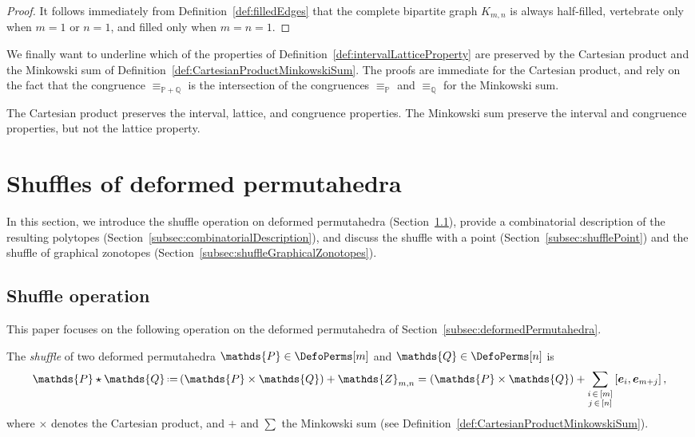 \documentclass[AHL,Unicode,longabstracts,published]{cedram}
\renewcommand{\b}[1]{\boldsymbol{#1}}
\newcommand{\eqdef}{\mbox{\,\raisebox{0.2ex}{\scriptsize\ensuremath{\mathrm:}}\ensuremath{=}\,}}
\newcommand{\shuffleDP}{\star} %
\newcommand{\polytope}[1]{\mathds{#1}}
\begin{document}
\begin{proof}
It follows immediately from Definition~\ref{def:filledEdges} that the complete bipartite graph $K_{m,n}$ is always half-filled, vertebrate only when $m = 1$ or $n = 1$, and filled only when $m = n = 1$.
\end{proof}

We finally want to underline which of the properties of Definition~\ref{def:intervalLatticeProperty} are preserved by the Cartesian product and the Minkowski sum of Definition~\ref{def:CartesianProductMinkowskiSum}. The proofs are immediate for the Cartesian product, and rely on the fact that the congruence $\equiv_{\polytope{P} + \polytope{Q}}$ is the intersection of the congruences $\equiv_\polytope{P}$ and $\equiv_\polytope{Q}$ for the Minkowski sum.

\begin{prop}\label{prop:CartesianProductMinkowskiSumLatticeProperties}
The Cartesian product preserves the interval, lattice, and congruence properties. The Minkowski sum preserve the interval and congruence properties, but not the lattice property.
\end{prop}



\section{Shuffles of deformed permutahedra}\label{sec:shuffles}

In this section, we introduce the shuffle operation on deformed permutahedra (Section~\ref{subsec:shuffle}), provide a combinatorial description of the resulting polytopes (Section~\ref{subsec:combinatorialDescription}), and discuss the shuffle with a point (Section~\ref{subsec:shufflePoint}) and the shuffle of graphical zonotopes (Section~\ref{subsec:shuffleGraphicalZonotopes}).



\subsection{Shuffle operation}\label{subsec:shuffle}

This paper focuses on the following operation on the deformed permutahedra of Section~\ref{subsec:deformedPermutahedra}.

\begin{defi}\label{def:shuffleDeformedPermutahedra}
The
\emph{shuffle} of two deformed permutahedra $\polytope{P} \in \DefoPerms[m]$ and $\polytope{Q} \in \DefoPerms[n]$ is
\[
\polytope{P} \shuffleDP \polytope{Q} \eqdef (\polytope{P} \times \polytope{Q}) + \polytope{Z}_{m,n} = (\polytope{P} \times \polytope{Q}) + \sum_{\substack{i\,\in\,[m] \\
j\,\in\,[n]}} \left[\b{e}_i, \b{e}_{m+j}\right],
\]
where $\times$ denotes the Cartesian product, and $+$ and $\sum$ the Minkowski sum (see Definition~\ref{def:CartesianProductMinkowskiSum}).
\end{defi}
\end{document}
